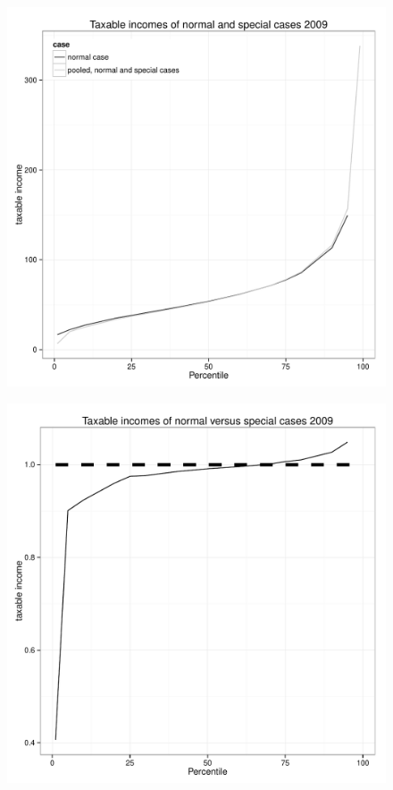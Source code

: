 \documentclass[twoside]{article}\usepackage[]{graphicx}\usepackage[]{color}
\makeatletter
\def\maxwidth{ %
  \ifdim\Gin@nat@width>\linewidth
    \linewidth
  \else
    \Gin@nat@width
  \fi
}
\newenvironment{knitrout}{}{} %
\makeatother
\begin{document}
\begin{multicols}{2}
\begin{knitrout}
\end{knitrout}


\begin{knitrout}
\color{fgcolor}\begin{figure}[]

\includegraphics[width=\maxwidth]{figure/specialcases091} \caption[]{\label{fig:specialcases091}}
\end{figure}

\begin{figure}[]

\includegraphics[width=\maxwidth]{figure/specialcases092} \caption[]{\label{fig:specialcases092}}
\end{figure}



\end{knitrout}
\end{multicols}
\end{document}
